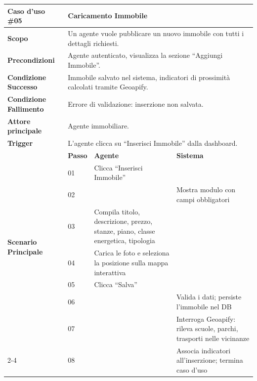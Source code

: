 \documentclass[a4paper,11pt]{article}
\renewcommand{\arraystretch}{1.18}
\begin{document}
\clearpage

\begin{table}[H]
\centering
\renewcommand{\arraystretch}{1.5}
\begin{tabular}{|p{2.8cm}|p{0.8cm}|p{4.2cm}|p{4.2cm}|}
\hline
\rowcolor[HTML]{010066}
{\color[HTML]{EFEFEF} \textbf{Caso d'uso \#05}} & \multicolumn{3}{l|}{\color[HTML]{FFFFFF} \textbf{Caricamento Immobile}} \\ \hline
\textbf{Scopo} & \multicolumn{3}{l|}{Un agente vuole pubblicare un nuovo immobile con tutti i dettagli richiesti.} \\ \hline
\textbf{Precondizioni} & \multicolumn{3}{l|}{Agente autenticato, visualizza la sezione ``Aggiungi Immobile''.} \\ \hline
\textbf{Condizione Successo} & \multicolumn{3}{l|}{Immobile salvato nel sistema, indicatori di prossimità calcolati tramite Geoapify.} \\ \hline
\textbf{Condizione Fallimento} & \multicolumn{3}{l|}{Errore di validazione: inserzione non salvata.} \\ \hline
\textbf{Attore principale} & \multicolumn{3}{l|}{Agente immobiliare.} \\ \hline
\textbf{Trigger} & \multicolumn{3}{l|}{L'agente clicca su ``Inserisci Immobile'' dalla dashboard.} \\ \hline

\multirow{8}{2.8cm}{\textbf{Scenario Principale}}
   & \textbf{Passo} & \textbf{Agente} & \textbf{Sistema} \\ \cline{2-4}
   & 01 & Clicca ``Inserisci Immobile'' & \\ \cline{2-4}
   & 02 & & Mostra modulo con campi obbligatori \\ \cline{2-4}
   & 03 & Compila titolo, descrizione, prezzo, stanze, piano, classe energetica, tipologia & \\ \cline{2-4}
   & 04 & Carica le foto e seleziona la posizione sulla mappa interattiva & \\ \cline{2-4}
   & 05 & Clicca ``Salva'' & \\ \cline{2-4}
   & 06 & & Valida i dati; persiste l'immobile nel DB \\ \cline{2-4}
   & 07 & & Interroga Geoapify: rileva scuole, parchi, trasporti nelle vicinanze \\ \cline{2-4}
   & 08 & & Associa indicatori all'inserzione; termina caso d'uso \\ \hline


\end{tabular}
\end{table}
\end{document}
